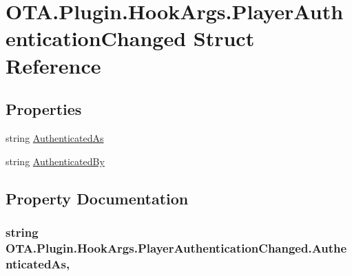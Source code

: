 \hypertarget{struct_o_t_a_1_1_plugin_1_1_hook_args_1_1_player_authentication_changed}{}\section{O\+T\+A.\+Plugin.\+Hook\+Args.\+Player\+Authentication\+Changed Struct Reference}
\label{struct_o_t_a_1_1_plugin_1_1_hook_args_1_1_player_authentication_changed}
\subsection*{Properties}
\begin{DoxyCompactItemize}
\item 
string \hyperlink{struct_o_t_a_1_1_plugin_1_1_hook_args_1_1_player_authentication_changed_acc8eff2a7e1dd1438cd82fde19bf04c6}{Authenticated\+As}
\item 
string \hyperlink{struct_o_t_a_1_1_plugin_1_1_hook_args_1_1_player_authentication_changed_aeb77429a87bc5534d08e1b1d8a63d50d}{Authenticated\+By}
\end{DoxyCompactItemize}


\subsection{Property Documentation}
\hypertarget{struct_o_t_a_1_1_plugin_1_1_hook_args_1_1_player_authentication_changed_acc8eff2a7e1dd1438cd82fde19bf04c6}{}
\subsubsection[{Authenticated\+As}]{\setlength{\rightskip}{0pt plus 5cm}string O\+T\+A.\+Plugin.\+Hook\+Args.\+Player\+Authentication\+Changed.\+Authenticated\+As\hspace{0.3cm}{\ttfamily [get]}, {\ttfamily [set]}}\label{struct_o_t_a_1_1_plugin_1_1_hook_args_1_1_player_authentication_changed_acc8eff2a7e1dd1438cd82fde19bf04c6}
\hypertarget{struct_o_t_a_1_1_plugin_1_1_hook_args_1_1_player_authentication_changed_aeb77429a87bc5534d08e1b1d8a63d50d}{}
